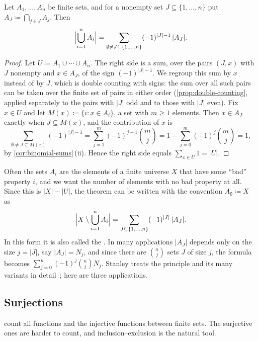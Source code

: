 \begin{theorem}
\label{thm:inclusion-exclusion}
Let $A_1,\ldots,A_n$ be finite sets, and for a nonempty set $J\subseteq\{1,\ldots,n\}$ put $A_J\coloneqq\bigcap_{j\in J}A_j$. Then
\[
\Bigl|\bigcup_{i=1}^{n}A_i\Bigr|=\sum_{\emptyset\ne J\subseteq\{1,\ldots,n\}}(-1)^{|J|-1}\,|A_J| .
\]
\end{theorem}

\begin{proof}
Let $U\coloneqq A_1\cup\cdots\cup A_n$. The right side is a sum, over the pairs $(J,x)$ with $J$ nonempty and $x\in A_J$, of the sign $(-1)^{|J|-1}$. We regroup this sum by $x$ instead of by $J$, which is double counting with signs: the sum over all such pairs can be taken over the finite set of pairs in either order (\cref{prop:double-counting}, applied separately to the pairs with $|J|$ odd and to those with $|J|$ even). Fix $x\in U$ and let $M(x)\coloneqq\{i: x\in A_i\}$, a set with $m\ge1$ elements. Then $x\in A_J$ exactly when $J\subseteq M(x)$, and the contribution of $x$ is
\[
\sum_{\emptyset\ne J\subseteq M(x)}(-1)^{|J|-1}=\sum_{j=1}^{m}(-1)^{j-1}\binom mj=1-\sum_{j=0}^{m}(-1)^j\binom mj=1,
\]
by \cref{cor:binomial-sums}\,(ii). Hence the right side equals $\sum_{x\in U}1=|U|$.
\end{proof}

Often the sets $A_i$ are the elements of a finite universe $X$ that have some ``bad'' property $i$, and we want the number of elements with no bad property at all. Since this is $|X|-|U|$, the theorem can be written with the convention $A_\emptyset\coloneqq X$ as
\begin{equation}
\Bigl|X\setminus\bigcup_{i=1}^{n}A_i\Bigr|=\sum_{J\subseteq\{1,\ldots,n\}}(-1)^{|J|}\,|A_J| .
\label{eq:sieve}
\end{equation}
In this form it is also called the . In many applications $|A_J|$ depends only on the size $j=|J|$, say $|A_J|=N_j$, and since there are $\binom nj$ sets $J$ of size $j$, the formula becomes $\sum_{j=0}^{n}(-1)^j\binom njN_j$. Stanley treats the principle and its many variants in detail~\cite[Chap.~2]{stanley2012ec1}; here are three applications.

\subsection{Surjections}

 count all functions and the injective functions between finite sets. The surjective ones are harder to count, and inclusion--exclusion is the natural tool.

